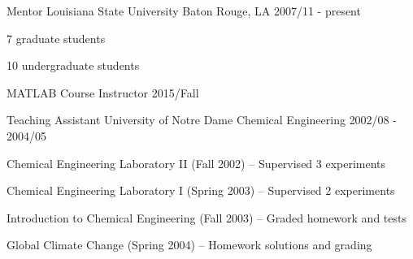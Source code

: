 
\begin{cventries}

  \cventry
    {Mentor} %
    {Louisiana State University} %
    {Baton Rouge, LA} %
    {2007/11 - present} %
    {
      \begin{cvitems} %
        \item {7 graduate students} %
        \item {10 undergraduate students} %
      \end{cvitems}
    }

  \cventry
    {MATLAB Course Instructor} %
    {} %
    {} %
    {2015/Fall} %
    {}
  \vspace{-10pt}

  \cventry
    {Teaching Assistant} %
    {University of Notre Dame} %
    {Chemical Engineering} %
    {2002/08 - 2004/05} %
    {
      \begin{cvitems} %
        \item {Chemical Engineering Laboratory II (Fall 2002) – Supervised 3 experiments}
        \item{Chemical Engineering Laboratory I (Spring 2003) – Supervised 2 experiments}
        \item{Introduction to Chemical Engineering (Fall 2003) – Graded homework and tests}
        \item{Global Climate Change (Spring 2004) – Homework solutions and grading}
      \end{cvitems}
    }
    
\end{cventries}